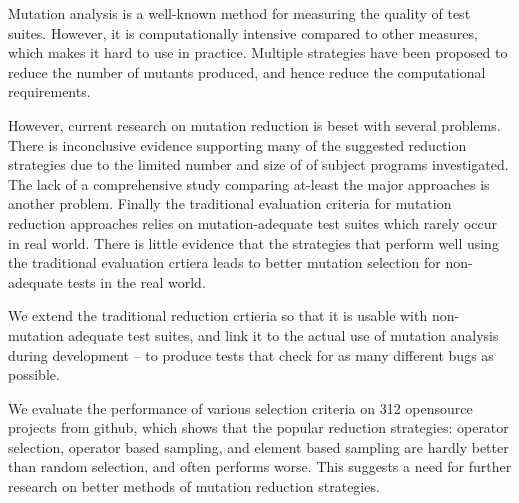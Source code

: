 Mutation analysis is a well-known method for measuring the quality of
test suites. However, it is computationally intensive compared to other
measures, which makes it hard to use in practice. Multiple strategies have
been proposed to reduce the number of mutants produced, and hence reduce
the computational requirements.

%
However, current research on mutation reduction is beset with several
problems. There is inconclusive evidence supporting many of the suggested
reduction strategies due to the limited number and size of of subject
programs investigated. The lack of a comprehensive study comparing
at-least the major approaches is another problem. Finally the traditional
evaluation criteria for mutation reduction approaches relies on
mutation-adequate test suites which rarely occur in real world. There is
little evidence that the strategies that perform well using the traditional
evaluation crtiera leads to better mutation selection for non-adequate
tests in the real world.


We extend the traditional reduction crtieria so that it is usable with
non-mutation adequate test suites, and link it to the actual use of
mutation analysis during development -- to produce tests that check for
as many different bugs as possible.

We evaluate the performance of various selection criteria on 312 opensource
projects from github, which shows that the popular reduction strategies:
operator selection, operator based sampling, and element based sampling
are hardly better than random selection, and often performs worse.
This suggests a need for further research on better methods of mutation
reduction strategies.






